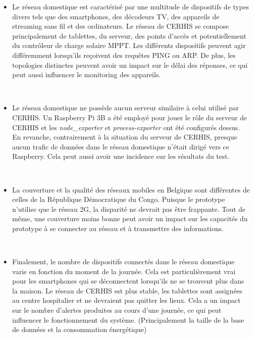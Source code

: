 \begin{itemize}
  \item Le réseau domestique est caractérisé par une multitude de dispositifs de types divers tels que des smartphones, des décodeurs TV, des appareils de streaming sans fil et des ordinateurs. Le réseau de CERHIS se compose principalement de tablettes, du serveur, des points d'accès et potentiellement du contrôleur de charge solaire MPPT. Les différents dispositifs peuvent agir différemment lorsqu'ils reçoivent des requêtes PING ou ARP. De plus, les topologies distinctes peuvent avoir un impact sur le délai des réponses, ce qui peut aussi influencer le monitoring des appareils.

  ~

  \item Le réseau domestique ne possède aucun serveur similaire à celui utilisé par CERHIS. Un Raspberry Pi 3B a été employé pour jouer le rôle du serveur de CERHIS et les \textit{node\_exporter} et \textit{process-exporter} ont été configurés dessus. En revanche, contrairement à la situation du serveur de CERHIS, presque aucun trafic de données dans le réseau domestique n'était dirigé vers ce Raspberry. Cela peut aussi avoir une incidence sur les résultats du test.

  ~

  \item La couverture et la qualité des réseaux mobiles en Belgique sont différentes de celles de la République Démocratique du Congo. Puisque le prototype n'utilise que le réseau 2G, la disparité ne devrait pas être frappante. Tout de même, une couverture moins bonne peut avoir un impact sur les capacités du prototype à se connecter au réseau et à transmettre des informations.

  ~

  \item Finalement, le nombre de dispositifs connectés dans le réseau domestique varie en fonction du moment de la journée. Cela est particulièrement vrai pour les smartphones qui se déconnectent lorsqu'ils ne se trouvent plus dans la maison. Le réseau de CERHIS est plus stable, les tablettes sont assignées au centre hospitalier et ne devraient pas quitter les lieux. Cela a un impact sur le nombre d'alertes produites au cours d'une journée, ce qui peut influencer le fonctionnement du système. (Principalement la taille de la base de données et la consommation énergétique)
\end{itemize}

~


